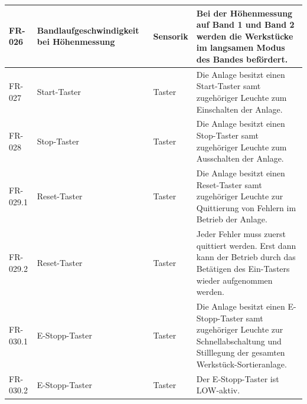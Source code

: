 \documentclass[oneside,a4paper,titlepage]{scrartcl} %
\begin{document}
\begin{small}
\begin{longtable}{|p{2cm}|p{4cm}|p{1.5cm}|p{5.5cm}|}
  \hline
  \rowcolor{gray} FR-026 & Bandlaufgeschwindigkeit bei Höhenmessung & Sensorik & Bei der Höhenmessung auf Band 1 und Band 2 werden die Werkstücke im langsamen Modus des Bandes befördert.\\
  \hline
  FR-027 & Start-Taster & Taster & Die Anlage besitzt einen Start-Taster samt zugehöriger Leuchte zum Einschalten der Anlage.\\
  \hline
  \rowcolor{gray} FR-028 & Stop-Taster & Taster & Die Anlage besitzt einen Stop-Taster samt zugehöriger Leuchte zum Ausschalten der Anlage.\\
  \hline
  FR-029.1 & Reset-Taster & Taster & Die Anlage besitzt einen Reset-Taster samt zugehöriger Leuchte zur Quittierung von Fehlern im Betrieb der Anlage.\\
  \hline
  FR-029.2 & Reset-Taster & Taster & Jeder Fehler muss zuerst quittiert werden. Erst dann kann der Betrieb durch das Betätigen des Ein-Tasters wieder aufgenommen werden.\\
  \hline
  \rowcolor{gray} FR-030.1 & E-Stopp-Taster & Taster & Die Anlage besitzt einen E-Stopp-Taster samt zugehöriger Leuchte zur Schnellabschaltung und Stilllegung der gesamten Werkstück-Sortieranlage.\\
  \hline
  \rowcolor{gray} FR-030.2 & E-Stopp-Taster & Taster & Der E-Stopp-Taster ist LOW-aktiv.\\
  \hline
 \end{longtable} 
\end{small}

\end{document}
